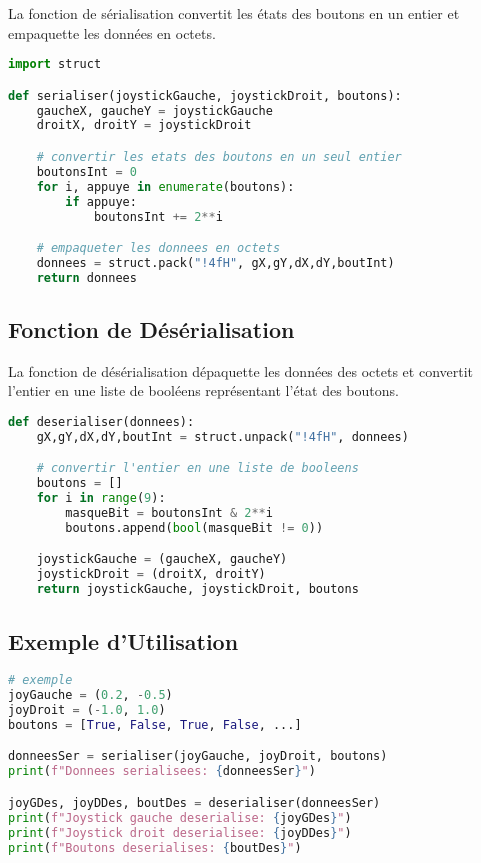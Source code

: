 \documentclass{article}
\begin{document}
La fonction de sérialisation convertit les états des boutons en un entier et empaquette les données en octets.

\begin{lstlisting}[language=Python, caption=Fonction de Serialisation]
import struct

def serialiser(joystickGauche, joystickDroit, boutons):
    gaucheX, gaucheY = joystickGauche
    droitX, droitY = joystickDroit

    # convertir les etats des boutons en un seul entier
    boutonsInt = 0
    for i, appuye in enumerate(boutons):
        if appuye:
            boutonsInt += 2**i

    # empaqueter les donnees en octets
    donnees = struct.pack("!4fH", gX,gY,dX,dY,boutInt)
    return donnees
\end{lstlisting}

\subsection{Fonction de Désérialisation}

La fonction de désérialisation dépaquette les données des octets et convertit l'entier en une liste de booléens représentant l'état des boutons.

\begin{lstlisting}[language=Python, caption=Fonction de Deserialisation]
def deserialiser(donnees):
    gX,gY,dX,dY,boutInt = struct.unpack("!4fH", donnees)

    # convertir l'entier en une liste de booleens
    boutons = []
    for i in range(9):
        masqueBit = boutonsInt & 2**i
        boutons.append(bool(masqueBit != 0))

    joystickGauche = (gaucheX, gaucheY)
    joystickDroit = (droitX, droitY)
    return joystickGauche, joystickDroit, boutons
\end{lstlisting}

\subsection{Exemple d'Utilisation}

\begin{lstlisting}[language=Python, caption=Exemple d'Utilisation]
# exemple
joyGauche = (0.2, -0.5)
joyDroit = (-1.0, 1.0)
boutons = [True, False, True, False, ...]

donneesSer = serialiser(joyGauche, joyDroit, boutons)
print(f"Donnees serialisees: {donneesSer}")

joyGDes, joyDDes, boutDes = deserialiser(donneesSer)
print(f"Joystick gauche deserialise: {joyGDes}")
print(f"Joystick droit deserialisee: {joyDDes}")
print(f"Boutons deserialises: {boutDes}")
\end{lstlisting}
\end{document}

